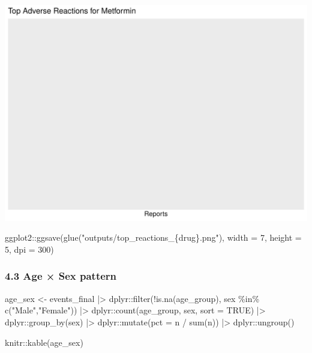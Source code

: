 \documentclass[
  letterpaper,
  DIV=11,
  numbers=noendperiod]{scrartcl}
\newenvironment{Shaded}{\begin{snugshade}}{\end{snugshade}}
\newcommand{\AttributeTok}[1]{\textcolor[rgb]{0.40,0.45,0.13}{#1}}
\newcommand{\ConstantTok}[1]{\textcolor[rgb]{0.56,0.35,0.01}{#1}}
\newcommand{\DecValTok}[1]{\textcolor[rgb]{0.68,0.00,0.00}{#1}}
\newcommand{\FunctionTok}[1]{\textcolor[rgb]{0.28,0.35,0.67}{#1}}
\newcommand{\NormalTok}[1]{\textcolor[rgb]{0.00,0.23,0.31}{#1}}
\newcommand{\OtherTok}[1]{\textcolor[rgb]{0.00,0.23,0.31}{#1}}
\newcommand{\SpecialCharTok}[1]{\textcolor[rgb]{0.37,0.37,0.37}{#1}}
\newcommand{\StringTok}[1]{\textcolor[rgb]{0.13,0.47,0.30}{#1}}
\begin{document}
\includegraphics{index_files/figure-pdf/plot-reactions-1.pdf}

\begin{Shaded}
\begin{Highlighting}[]
\NormalTok{ggplot2}\SpecialCharTok{::}\FunctionTok{ggsave}\NormalTok{(}\FunctionTok{glue}\NormalTok{(}\StringTok{"outputs/top\_reactions\_\{drug\}.png"}\NormalTok{), }\AttributeTok{width =} \DecValTok{7}\NormalTok{, }\AttributeTok{height =} \DecValTok{5}\NormalTok{, }\AttributeTok{dpi =} \DecValTok{300}\NormalTok{)}
\end{Highlighting}
\end{Shaded}

\subsubsection{4.3 Age × Sex pattern}\label{age-sex-pattern}

\begin{Shaded}
\begin{Highlighting}[]
\NormalTok{age\_sex }\OtherTok{\textless{}{-}}\NormalTok{ events\_final }\SpecialCharTok{|\textgreater{}}
\NormalTok{  dplyr}\SpecialCharTok{::}\FunctionTok{filter}\NormalTok{(}\SpecialCharTok{!}\FunctionTok{is.na}\NormalTok{(age\_group), sex }\SpecialCharTok{\%in\%} \FunctionTok{c}\NormalTok{(}\StringTok{"Male"}\NormalTok{,}\StringTok{"Female"}\NormalTok{)) }\SpecialCharTok{|\textgreater{}}
\NormalTok{  dplyr}\SpecialCharTok{::}\FunctionTok{count}\NormalTok{(age\_group, sex, }\AttributeTok{sort =} \ConstantTok{TRUE}\NormalTok{) }\SpecialCharTok{|\textgreater{}}
\NormalTok{  dplyr}\SpecialCharTok{::}\FunctionTok{group\_by}\NormalTok{(sex) }\SpecialCharTok{|\textgreater{}}
\NormalTok{  dplyr}\SpecialCharTok{::}\FunctionTok{mutate}\NormalTok{(}\AttributeTok{pct =}\NormalTok{ n }\SpecialCharTok{/} \FunctionTok{sum}\NormalTok{(n)) }\SpecialCharTok{|\textgreater{}}
\NormalTok{  dplyr}\SpecialCharTok{::}\FunctionTok{ungroup}\NormalTok{()}

\NormalTok{knitr}\SpecialCharTok{::}\FunctionTok{kable}\NormalTok{(age\_sex)}
\end{Highlighting}
\end{Shaded}
\end{document}
